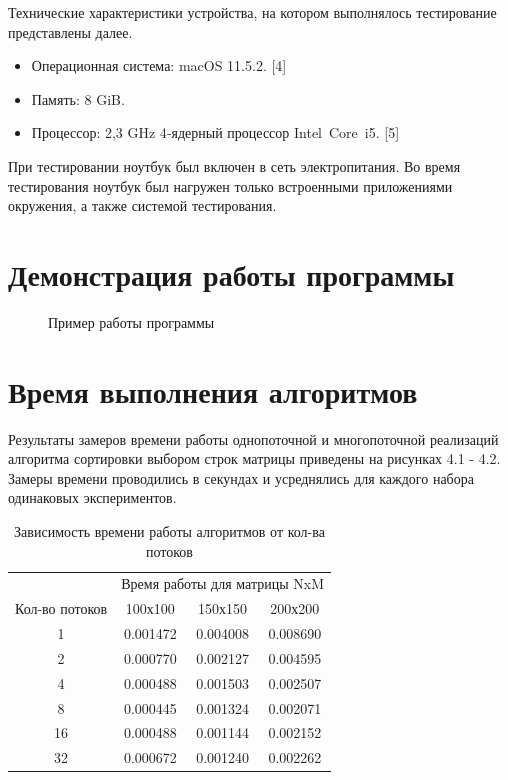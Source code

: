 \documentclass[a4paper,14pt, unknownkeysallowed]{extreport}
\newcommand{\img}[3] {
	\begin{figure}[h!]
		\center{\texttt{[image: img/\#2]}}
		\caption{#3}
		\label{img:#2}
	\end{figure}
}
\begin{document}
Технические характеристики устройства, на котором выполнялось тестирование представлены далее.

\begin{itemize}
    \item Операционная система: macOS 11.5.2. [4]
    \item Память: 8 GiB.
    \item Процессор: 2,3 GHz 4‑ядерный процессор Intel Core i5. [5]
\end{itemize}

При тестировании ноутбук был включен в сеть электропитания. Во время тестирования ноутбук был нагружен только встроенными приложениями окружения, а также системой тестирования.

\clearpage

\section{Демонстрация работы программы}

\img{220mm}{example}{Пример работы программы}

\clearpage

\section{Время выполнения алгоритмов}

Результаты замеров времени работы однопоточной и многопоточной реализаций алгоритма сортировки выбором строк матрицы приведены на рисунках 4.1 - 4.2. Замеры времени проводились в секундах и усреднялись для каждого набора одинаковых экспериментов.

\begin{table}[h]
	\begin{center}
	\begin{threeparttable}
		\captionsetup{justification=raggedright,singlelinecheck=off}
		\caption{\label{tbl:different_threads} Зависимость времени работы алгоритмов от кол-ва потоков}
		\begin{tabular}{|c|c|c|c|}
			\hline 
			& \multicolumn{3}{c|}{Время работы для матрицы NxM} \\ \cline{2-4}
			Кол-во потоков & 100х100 & 150х150 & 200х200 \\
			\hline
			1 & 0.001472 & 0.004008 & 0.008690 \\
			\hline
			2 & 0.000770 & 0.002127 & 0.004595 \\
			\hline
			4 & 0.000488 & 0.001503 & 0.002507 \\
			\hline
			8 & 0.000445 & 0.001324 & 0.002071 \\
			\hline
			16 & 0.000488 & 0.001144 & 0.002152 \\
			\hline
			32 & 0.000672 & 0.001240 & 0.002262 \\
			\hline
		\end{tabular}
	\end{threeparttable}
	\end{center}
\end{table}
\end{document}
